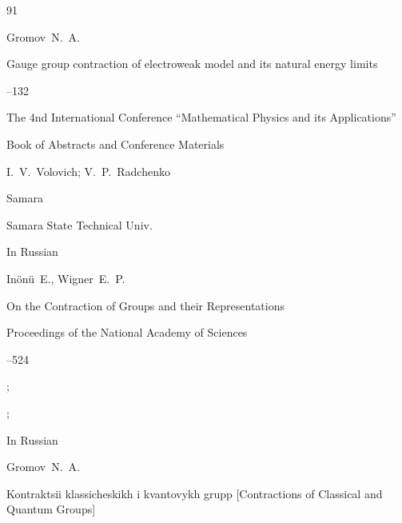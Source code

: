 




\EngRef



\begin{thebibliography}{91}




\by  Gromov~N.~A.

\paper Gauge group contraction of electroweak model and its natural energy limits

--132

\inbook  The 4nd International Conference ``Mathematical Physics and its Applications''

\bookinfo Book of Abstracts and Conference Materials

\eds I.~V.~Volovich; V.~P.~Radchenko

\publaddr Samara

\publ Samara State Technical Univ.


\lang In Russian








\by In{\"o}n{\"u}~E., Wigner~E.~P.  

\paper On the Contraction of Groups and their Representations

\jour   Proceedings of the National Academy of Sciences




--524

;


;








\lang In Russian

\by  Gromov~N.~A.

\book Kontraktsii klassicheskikh i kvantovykh grupp \rm [Contractions of Classical and Quantum Groups]


\end{thebibliography}

